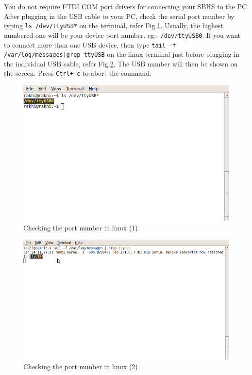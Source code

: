 You do not require FTDI COM port drivers for connecting your SBHS to the PC. After plugging in the USB cable to your PC, check the serial port number by typing {\tt ls /dev/ttyUSB*} on the terminal, refer Fig.\ref{lstty}. Usually, the highest numbered one will be your device port number. eg:- {\tt /dev/ttyUSB0}. If you want to connect more than one USB device, then type {\tt tail -f /var/log/messages|grep ttyUSB} on the linux terminal just before plugging in the individual USB cable, refer Fig.\ref{tailusb}. The USB number will then be shown on the screen. Press {\tt Ctrl+ c} to abort the command. 
\begin{figure}
\centering
\includegraphics[width=0.7\linewidth]{using-sbhs/lstty.png}
\caption{Checking the port number in linux (1)}
\label{lstty}
\end{figure}
\begin{figure}
\centering
\includegraphics[width=0.7\linewidth]{using-sbhs/tailusb.png}
\caption{Checking the port number in linux (2)}
\label{tailusb}
\end{figure}

